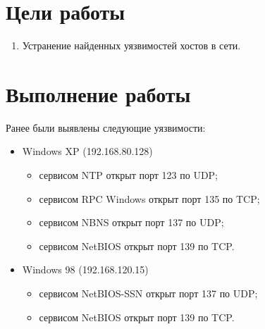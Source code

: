 \documentclass[a4paper, 12pt]{article}		%
\begin{document}


%
\section{Цели работы}
\begin{enumerate}
\item Устранение найденных уязвимостей хостов в сети.
\end{enumerate}

\section{Выполнение работы}
Ранее были выявлены следующие уязвимости:
\begin{itemize}
\item Windows XP (192.168.80.128)
\begin{itemize}
\item сервисом NTP открыт порт 123 по UDP;
\item сервисом RPC Windows открыт порт 135 по TCP;
\item сервисом NBNS открыт порт 137 по UDP;
\item сервисом NetBIOS открыт порт 139 по TCP.
\end{itemize}
\item Windows 98 (192.168.120.15)
\begin{itemize}
\item сервисом NetBIOS-SSN открыт порт 137 по UDP;
\item сервисом NetBIOS открыт порт 139 по TCP.
\end{itemize}
\end{itemize}
\end{document}
